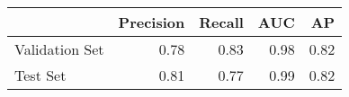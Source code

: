 \begin{tabular}{lrrrr}
\toprule
{} &  Precision &  Recall &  AUC &   AP \\
\midrule
Validation Set &       0.78 &    0.83 & 0.98 & 0.82 \\
Test Set       &       0.81 &    0.77 & 0.99 & 0.82 \\
\bottomrule
\end{tabular}
